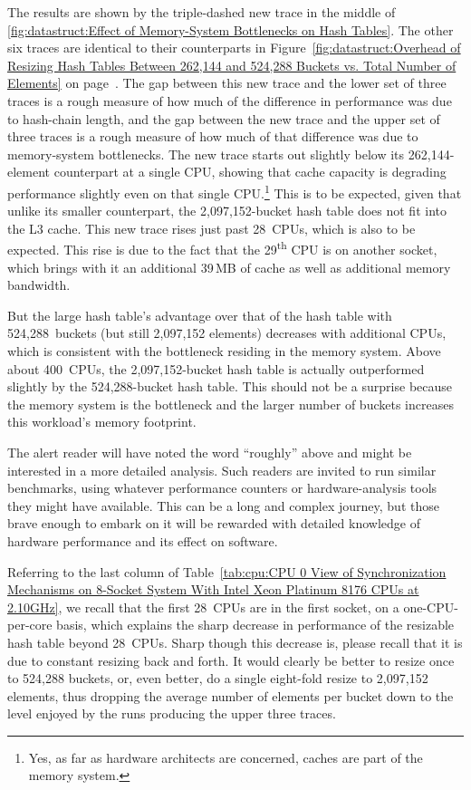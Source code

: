 {	The results are shown by the triple-dashed new trace in
	the middle of
	\cref{fig:datastruct:Effect of Memory-System Bottlenecks on Hash Tables}.
	The other six traces are identical to their counterparts in
	Figure~\ref{fig:datastruct:Overhead of Resizing Hash Tables Between 262,144 and 524,288 Buckets vs. Total Number of Elements}
	on page~\pageref{fig:datastruct:Overhead of Resizing Hash Tables Between 262,144 and 524,288 Buckets vs. Total Number of Elements}.
	The gap between this new trace and the lower set of three
	traces is a rough measure of how much of the difference in
	performance was due to hash-chain length, and the gap between
	the new trace and the upper set of three traces is a rough measure
	of how much of that difference was due to memory-system bottlenecks.
	The new trace starts out slightly below its 262,144-element
	counterpart at a single CPU, showing that cache capacity is
	degrading performance slightly even on that single CPU.\footnote{
		Yes, as far as hardware architects are concerned,
		caches are part of the memory system.}
	This is to be expected, given that unlike its smaller counterpart,
	the 2,097,152-bucket hash table does not fit into the L3 cache.
	This new trace rises just past 28~CPUs, which is also to be
	expected.
	This rise is due to the fact that the 29\textsuperscript{th}
	CPU is on another socket, which brings with it an additional
	39\,MB of cache as well as additional memory bandwidth.

	But the large hash table's advantage over that of the hash table
	with 524,288~buckets (but still 2,097,152 elements) decreases
	with additional CPUs, which is consistent with the bottleneck
	residing in the memory system.
	Above about 400~CPUs, the 2,097,152-bucket hash table is
	actually outperformed slightly by the 524,288-bucket hash
	table.
	This should not be a surprise because the memory system is
	the bottleneck and the larger number of buckets increases this
	workload's memory footprint.

	The alert reader will have noted the word ``roughly'' above
	and might be interested in a more detailed analysis.
	Such readers are invited to run similar benchmarks, using
	whatever performance counters or hardware-analysis tools
	they might have available.
	This can be a long and complex journey, but those brave enough
	to embark on it will be rewarded with detailed knowledge of
	hardware performance and its effect on software.
}\QuickQuizEnd

Referring to the last column of
Table~\ref{tab:cpu:CPU 0 View of Synchronization Mechanisms on 8-Socket System With Intel Xeon Platinum 8176 CPUs at 2.10GHz},
we recall that the first 28~CPUs are in the first socket, on a
one-CPU-per-core basis, which explains the sharp decrease in performance
of the resizable hash table beyond 28~CPUs.
Sharp though this decrease is, please recall that it is due to constant
resizing back and forth.
It would clearly be better to resize once to 524,288 buckets,
or, even better, do a single eight-fold resize to 2,097,152 elements,
thus dropping the average number of elements per bucket down to the
level enjoyed by the runs producing the upper three traces.

